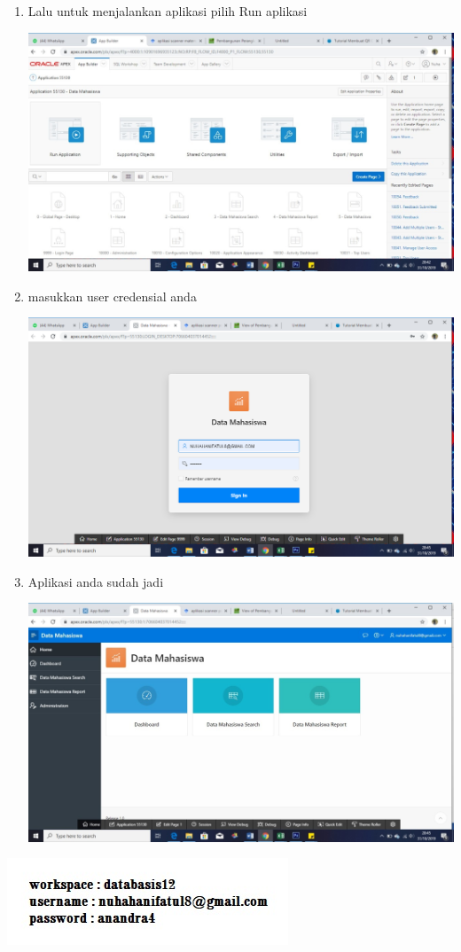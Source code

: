 \documentclass[a4paper,12pt]{report}
\begin{document}
\begin{enumerate}
\begin{center}
    \end{center}
    \item Lalu untuk menjalankan aplikasi pilih Run aplikasi
    \begin{center}
    \includegraphics[width=11cm\textwidth]{figure/10.jpg}
    \end{center}
    \item masukkan user credensial anda
    \begin{center}
    \includegraphics[width=11cm\textwidth]{figure/user.png}
    \end{center}
    \item Aplikasi anda sudah jadi
    \begin{center}
    \includegraphics[width=11cm\textwidth]{figure/11.jpg}
    \end{center}
\end{enumerate}


    \includegraphics[width=6cm\textwidth]{figure/nuha.jpg}
\end{document}
